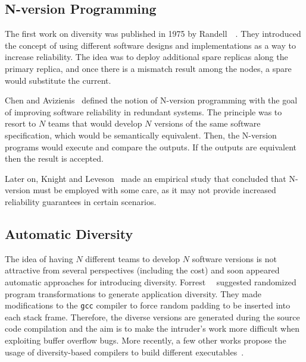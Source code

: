 \subsection{N-version Programming}
The first work on diversity was published in 1975 by Randell~\etal{}~\cite{Randell:1975}. 
They introduced the concept of using different software designs and implementations as a way to increase reliability. 
The idea was to deploy additional spare replicas along the primary replica, and once there is a mismatch result among the nodes, a spare would substitute the current.


Chen and Avizienis~\cite{Avizienis:1977,Chen:1978} defined the notion of N-version programming with the goal of improving software reliability in redundant systems.
The principle was to resort to $N$ teams that would develop $N$ versions of the same software specification, which would be semantically equivalent.
Then, the N-version programs would execute and compare the outputs.
If the outputs are equivalent then the result is accepted.


Later on, Knight and Leveson~\cite{Knight:1986} made an empirical study that concluded that N-version must be employed with some care, as it may not provide increased reliability guarantees in certain scenarios. 

\subsection{Automatic Diversity}  
The idea of having $N$ different teams to develop $N$ software versions is not attractive from several perspectives (including the cost) and soon appeared automatic approaches for introducing diversity.
Forrest~\etal{}~\cite{Forrest:1997} suggested randomized program transformations to generate application diversity.
They made modifications to the \texttt{gcc} compiler to force random padding to be inserted into each stack frame. 
Therefore, the diverse versions are generated during the source code compilation and the aim is to make the intruder’s work more difficult when exploiting buffer overflow bugs.
More recently, a few other works propose the usage of diversity-based compilers to build different executables~\cite{Platania:2014,Roeder:2010,King:2016,Koo:2018}.


